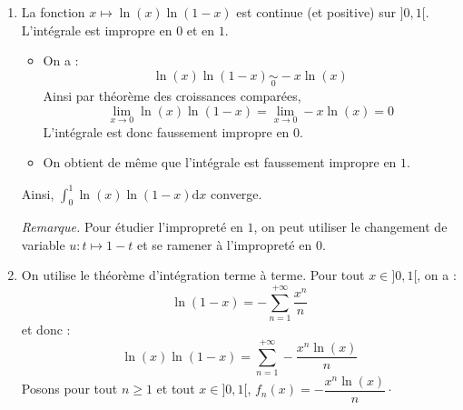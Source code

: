 \documentclass[a4paper,twoside,french,11pt]{VcCours}
\newcommand{\dx}{\text{d}x}
\begin{document}
\begin{corr}
\begin{enumerate}
\item La fonction $x \mapsto \ln(x) \ln(1-x)$ est continue (et positive) sur $]0,1[$. L'intégrale est impropre en $0$ et en $1$.
\begin{itemize}
\item On a :
$$  \ln(x) \ln(1-x) \underset{0}{\sim} -x \ln(x)$$
Ainsi par théorème des croissances comparées,
$$ \lim_{x \rightarrow 0 }   \ln(x) \ln(1-x) =  \lim_{x \rightarrow 0 }  -x \ln(x) = 0$$
L'intégrale est donc faussement impropre en $0$.
\item On obtient de même que l'intégrale est faussement impropre en $1$.
\end{itemize}
Ainsi, $\int_{0}^1 \ln(x) \ln(1-x) \dx$ converge.

%
\textit{Remarque.} Pour étudier l'impropreté en $1$, on peut utiliser le changement de variable $u : t \mapsto 1-t$ et se ramener à l'impropreté en $0$.


\item On utilise le théorème d'intégration terme à terme. Pour tout $x \in ]0,1[$, on a :
$$ \ln(1-x) = - \sum_{n=1}^{+ \infty} \dfrac{x^n}{n}$$
et donc :
$$ \ln(x)\ln(1-x) = \sum_{n=1}^{+ \infty} - \dfrac{x^n \ln(x)}{n}$$
Posons pour tout $n \geq 1$ et tout $x \in ]0,1[$, $f_n(x)=  - \dfrac{x^n \ln(x)}{n} \cdot$


\end{enumerate}
\end{corr}
\end{document}
